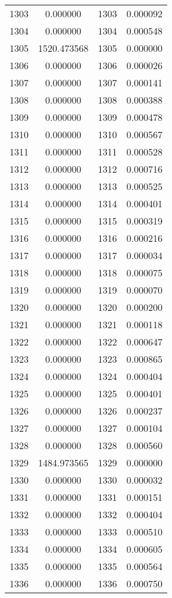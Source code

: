 \documentclass[12pt]{article}
\begin{document}
\begin{longtable}{@{}cccc@{}}
1303 & 0.000000 & 1303 & 0.000092 \\
1304 & 0.000000 & 1304 & 0.000548 \\
1305 & 1520.473568 & 1305 & 0.000000 \\
1306 & 0.000000 & 1306 & 0.000026 \\
1307 & 0.000000 & 1307 & 0.000141 \\
1308 & 0.000000 & 1308 & 0.000388 \\
1309 & 0.000000 & 1309 & 0.000478 \\
1310 & 0.000000 & 1310 & 0.000567 \\
1311 & 0.000000 & 1311 & 0.000528 \\
1312 & 0.000000 & 1312 & 0.000716 \\
1313 & 0.000000 & 1313 & 0.000525 \\
1314 & 0.000000 & 1314 & 0.000401 \\
1315 & 0.000000 & 1315 & 0.000319 \\
1316 & 0.000000 & 1316 & 0.000216 \\
1317 & 0.000000 & 1317 & 0.000034 \\
1318 & 0.000000 & 1318 & 0.000075 \\
1319 & 0.000000 & 1319 & 0.000070 \\
1320 & 0.000000 & 1320 & 0.000200 \\
1321 & 0.000000 & 1321 & 0.000118 \\
1322 & 0.000000 & 1322 & 0.000647 \\
1323 & 0.000000 & 1323 & 0.000865 \\
1324 & 0.000000 & 1324 & 0.000404 \\
1325 & 0.000000 & 1325 & 0.000401 \\
1326 & 0.000000 & 1326 & 0.000237 \\
1327 & 0.000000 & 1327 & 0.000104 \\
1328 & 0.000000 & 1328 & 0.000560 \\
1329 & 1484.973565 & 1329 & 0.000000 \\
1330 & 0.000000 & 1330 & 0.000032 \\
1331 & 0.000000 & 1331 & 0.000151 \\
1332 & 0.000000 & 1332 & 0.000404 \\
1333 & 0.000000 & 1333 & 0.000510 \\
1334 & 0.000000 & 1334 & 0.000605 \\
1335 & 0.000000 & 1335 & 0.000564 \\
1336 & 0.000000 & 1336 & 0.000750 \\

\end{longtable}
\end{document}

